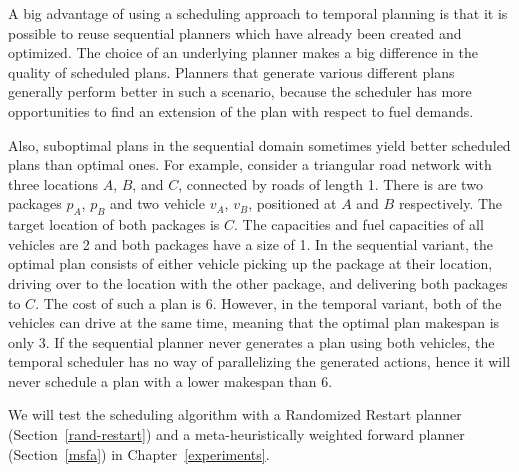 A big advantage of using a scheduling approach to temporal planning
is that it is possible to
reuse sequential planners which have already been created
and optimized.
The choice of an underlying planner makes a big difference
in the quality of scheduled plans. Planners
that generate various different plans generally perform better
in such a scenario, because the scheduler has more
opportunities to find an extension of the plan with respect to fuel demands.

Also, suboptimal plans in the sequential domain
sometimes yield better scheduled plans than optimal ones.
For example, consider a triangular road network with three locations $A$, $B$, and $C$, connected by roads of length 1.
There is are two packages $p_A$, $p_B$ and two vehicle $v_A$, $v_B$,
positioned at $A$ and $B$ respectively. The target location of both
packages is $C$. The capacities and fuel capacities of all vehicles
are 2 and both packages have a size of 1.
In the sequential variant, the optimal plan consists of either
vehicle picking up the package at their location, driving
over to the location with the other package, and delivering both packages
to $C$. The cost of such a plan is $6$.
However, in the temporal variant, both of the vehicles can drive at the same time, meaning that the optimal plan makespan is only $3$.
If the sequential planner never generates a plan
using both vehicles, the temporal scheduler has no way of
parallelizing the generated actions, hence it will never
schedule a plan with a lower makespan than $6$.

We will test the scheduling algorithm with a Randomized Restart planner (Section~\ref{rand-restart})
and a meta-heuristically weighted forward planner (Section~\ref{msfa}) in Chapter~\ref{experiments}.



























